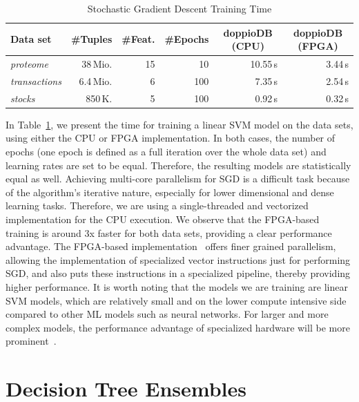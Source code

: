 \documentclass[11pt,dvipdfm]{article}
\newcommand{\centercell}[1]{\multicolumn{1}{c|}{#1}}
\newcommand{\head}[1]{\centercell{\textbf{#1}}}
\newcommand{\headlast}[1]{\multicolumn{1}{c}{\textbf{#1}}}
\begin{document}
\begin{table}[t]
	\centering
	\caption{Stochastic Gradient Descent Training Time}
	\def\arraystretch{1.2}
	\begin{tabular}{l|r|r|r|r|r}
		\textbf{Data set} & \head{\#Tuples} & \head{\#Feat.} & \head{\#Epochs} & \head{doppioDB (CPU)} & \headlast{doppioDB (FPGA)} \\
		\hline
		\emph{proteome}     & 38\,Mio.   & 15 & 10  & 10.55\,s & 3.44\,s \\
		\emph{transactions} & 6.4\,Mio.  & 6  & 100 & 7.35\,s  & 2.54\,s \\
		\emph{stocks}       & 850\,K.    & 5  & 100 & 0.92\,s  & 0.32\,s \\
	\end{tabular} 
	\label{tab:sgd-result}
\end{table}

In Table~\ref{tab:sgd-result}, we present the time for training a linear SVM model on the data sets, using either the CPU or FPGA implementation. In both cases, the number of epochs (one epoch is defined as a full iteration over the whole data set) and learning rates are set to be equal. Therefore, the resulting models are statistically equal as well. Achieving multi-core parallelism for SGD is a difficult task because of the algorithm's iterative nature, especially for lower dimensional and dense learning tasks. Therefore, we are using a single-threaded and vectorized implementation for the CPU execution. We observe that the FPGA-based training is around 3x faster for both data sets, providing a clear performance advantage. The FPGA-based implementation~\cite{kara2017fpga2} offers finer grained parallelism, allowing the implementation of specialized vector instructions just for performing SGD, and also puts these instructions in a specialized pipeline, thereby providing higher performance. It is worth noting that the models we are training are linear SVM models, which are relatively small and on the lower compute intensive side compared to other ML models such as neural networks. For larger and more complex models, the performance advantage of specialized hardware will be more prominent~\cite{umuroglu2017finn, nurvitadhi2017can}. 




\section{Decision Tree Ensembles}
\label{sec:dt}
\end{document}
